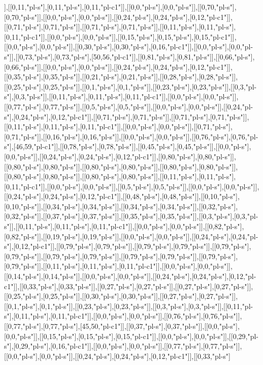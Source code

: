 ],[[0,11,"pl-s"],[0,11,"pl-s"],[0,11,"pl-c1"]],[[0,0,"pl-s"],[0,0,"pl-s"]],[[0,70,"pl-s"],[0,70,"pl-s"]],[[0,0,"pl-s"],[0,0,"pl-s"]],[[0,24,"pl-s"],[0,24,"pl-s"],[0,12,"pl-c1"]],[[0,71,"pl-s"],[0,71,"pl-s"]],[[0,71,"pl-s"],[0,71,"pl-s"]],[[0,11,"pl-s"],[0,11,"pl-s"],[0,11,"pl-c1"]],[[0,0,"pl-s"],[0,0,"pl-s"]],[[0,15,"pl-s"],[0,15,"pl-s"],[0,15,"pl-c1"]],[[0,0,"pl-s"],[0,0,"pl-s"]],[[0,30,"pl-s"],[0,30,"pl-s"],[0,16,"pl-c1"]],[[0,0,"pl-s"],[0,0,"pl-s"]],[[0,73,"pl-s"],[0,73,"pl-s"],[50,56,"pl-c1"]],[[0,81,"pl-s"],[0,81,"pl-s"]],[[0,66,"pl-s"],[0,66,"pl-s"]],[[0,0,"pl-s"],[0,0,"pl-s"]],[[0,24,"pl-s"],[0,24,"pl-s"],[0,12,"pl-c1"]],[[0,35,"pl-s"],[0,35,"pl-s"]],[[0,21,"pl-s"],[0,21,"pl-s"]],[[0,28,"pl-s"],[0,28,"pl-s"]],[[0,25,"pl-s"],[0,25,"pl-s"]],[[0,1,"pl-s"],[0,1,"pl-s"]],[[0,23,"pl-s"],[0,23,"pl-s"]],[[0,3,"pl-s"],[0,3,"pl-s"]],[[0,11,"pl-s"],[0,11,"pl-s"],[0,11,"pl-c1"]],[[0,0,"pl-s"],[0,0,"pl-s"]],[[0,77,"pl-s"],[0,77,"pl-s"]],[[0,5,"pl-s"],[0,5,"pl-s"]],[[0,0,"pl-s"],[0,0,"pl-s"]],[[0,24,"pl-s"],[0,24,"pl-s"],[0,12,"pl-c1"]],[[0,71,"pl-s"],[0,71,"pl-s"]],[[0,71,"pl-s"],[0,71,"pl-s"]],[[0,11,"pl-s"],[0,11,"pl-s"],[0,11,"pl-c1"]],[[0,0,"pl-s"],[0,0,"pl-s"]],[[0,71,"pl-s"],[0,71,"pl-s"]],[[0,16,"pl-s"],[0,16,"pl-s"]],[[0,0,"pl-s"],[0,0,"pl-s"]],[[0,76,"pl-s"],[0,76,"pl-s"],[46,59,"pl-c1"]],[[0,78,"pl-s"],[0,78,"pl-s"]],[[0,45,"pl-s"],[0,45,"pl-s"]],[[0,0,"pl-s"],[0,0,"pl-s"]],[[0,24,"pl-s"],[0,24,"pl-s"],[0,12,"pl-c1"]],[[0,80,"pl-s"],[0,80,"pl-s"]],[[0,80,"pl-s"],[0,80,"pl-s"]],[[0,80,"pl-s"],[0,80,"pl-s"]],[[0,80,"pl-s"],[0,80,"pl-s"]],[[0,80,"pl-s"],[0,80,"pl-s"]],[[0,80,"pl-s"],[0,80,"pl-s"]],[[0,11,"pl-s"],[0,11,"pl-s"],[0,11,"pl-c1"]],[[0,0,"pl-s"],[0,0,"pl-s"]],[[0,5,"pl-s"],[0,5,"pl-s"]],[[0,0,"pl-s"],[0,0,"pl-s"]],[[0,24,"pl-s"],[0,24,"pl-s"],[0,12,"pl-c1"]],[[0,48,"pl-s"],[0,48,"pl-s"]],[[0,10,"pl-s"],[0,10,"pl-s"]],[[0,34,"pl-s"],[0,34,"pl-s"]],[[0,34,"pl-s"],[0,34,"pl-s"]],[[0,32,"pl-s"],[0,32,"pl-s"]],[[0,37,"pl-s"],[0,37,"pl-s"]],[[0,35,"pl-s"],[0,35,"pl-s"]],[[0,3,"pl-s"],[0,3,"pl-s"]],[[0,11,"pl-s"],[0,11,"pl-s"],[0,11,"pl-c1"]],[[0,0,"pl-s"],[0,0,"pl-s"]],[[0,82,"pl-s"],[0,82,"pl-s"]],[[0,19,"pl-s"],[0,19,"pl-s"]],[[0,0,"pl-s"],[0,0,"pl-s"]],[[0,24,"pl-s"],[0,24,"pl-s"],[0,12,"pl-c1"]],[[0,79,"pl-s"],[0,79,"pl-s"]],[[0,79,"pl-s"],[0,79,"pl-s"]],[[0,79,"pl-s"],[0,79,"pl-s"]],[[0,79,"pl-s"],[0,79,"pl-s"]],[[0,79,"pl-s"],[0,79,"pl-s"]],[[0,79,"pl-s"],[0,79,"pl-s"]],[[0,11,"pl-s"],[0,11,"pl-s"],[0,11,"pl-c1"]],[[0,0,"pl-s"],[0,0,"pl-s"]],[[0,14,"pl-s"],[0,14,"pl-s"]],[[0,0,"pl-s"],[0,0,"pl-s"]],[[0,24,"pl-s"],[0,24,"pl-s"],[0,12,"pl-c1"]],[[0,33,"pl-s"],[0,33,"pl-s"]],[[0,27,"pl-s"],[0,27,"pl-s"]],[[0,27,"pl-s"],[0,27,"pl-s"]],[[0,25,"pl-s"],[0,25,"pl-s"]],[[0,30,"pl-s"],[0,30,"pl-s"]],[[0,27,"pl-s"],[0,27,"pl-s"]],[[0,1,"pl-s"],[0,1,"pl-s"]],[[0,23,"pl-s"],[0,23,"pl-s"]],[[0,3,"pl-s"],[0,3,"pl-s"]],[[0,11,"pl-s"],[0,11,"pl-s"],[0,11,"pl-c1"]],[[0,0,"pl-s"],[0,0,"pl-s"]],[[0,76,"pl-s"],[0,76,"pl-s"]],[[0,77,"pl-s"],[0,77,"pl-s"],[45,50,"pl-c1"]],[[0,37,"pl-s"],[0,37,"pl-s"]],[[0,0,"pl-s"],[0,0,"pl-s"]],[[0,15,"pl-s"],[0,15,"pl-s"],[0,15,"pl-c1"]],[[0,0,"pl-s"],[0,0,"pl-s"]],[[0,29,"pl-s"],[0,29,"pl-s"],[0,16,"pl-c1"]],[[0,0,"pl-s"],[0,0,"pl-s"]],[[0,77,"pl-s"],[0,77,"pl-s"]],[[0,0,"pl-s"],[0,0,"pl-s"]],[[0,24,"pl-s"],[0,24,"pl-s"],[0,12,"pl-c1"]],[[0,33,"pl-s"]